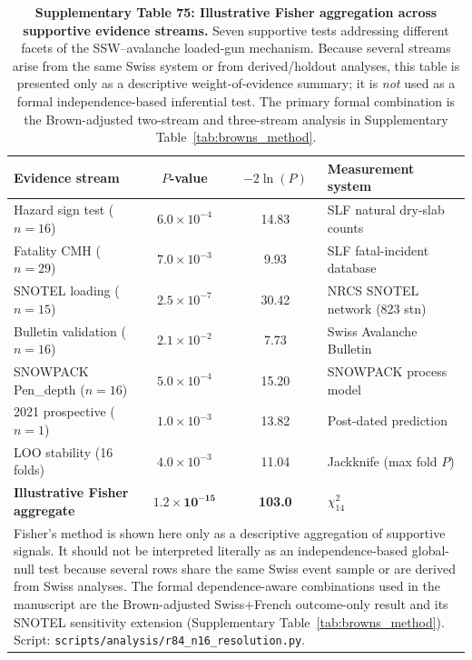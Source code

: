 \documentclass[11pt,letterpaper]{article}
\begin{document}
\begin{table}[!ht]
\centering
\caption{\textbf{Supplementary Table 75: Illustrative Fisher aggregation across supportive evidence streams.}
Seven supportive tests addressing different facets of the SSW--avalanche loaded-gun mechanism. Because several streams arise from the same Swiss system or from derived/holdout analyses, this table is presented only as a descriptive weight-of-evidence summary; it is \emph{not} used as a formal independence-based inferential test. The primary formal combination is the Brown-adjusted two-stream and three-stream analysis in Supplementary Table~\ref{tab:browns_method}.}
\label{tab:fisher_combined}
\small
\begin{tabular}{lccl}
\toprule
Evidence stream & $P$-value & $-2\ln(P)$ & Measurement system \\
\midrule
Hazard sign test ($n = 16$) & $6.0 \times 10^{-4}$ & 14.83 & SLF natural dry-slab counts \\
Fatality CMH ($n = 29$) & $7.0 \times 10^{-3}$ & 9.93 & SLF fatal-incident database \\
SNOTEL loading ($n = 15$) & $2.5 \times 10^{-7}$ & 30.42 & NRCS SNOTEL network (823 stn) \\
Bulletin validation ($n = 16$) & $2.1 \times 10^{-2}$ & 7.73 & Swiss Avalanche Bulletin \\
SNOWPACK Pen\_depth ($n = 16$) & $5.0 \times 10^{-4}$ & 15.20 & SNOWPACK process model \\
2021 prospective ($n = 1$) & $1.0 \times 10^{-3}$ & 13.82 & Post-dated prediction \\
LOO stability (16 folds) & $4.0 \times 10^{-3}$ & 11.04 & Jackknife (max fold $P$) \\
\midrule
\textbf{Illustrative Fisher aggregate} & $\mathbf{1.2 \times 10^{-15}}$ & \textbf{103.0} & $\chi^2_{14}$ \\
\bottomrule
\multicolumn{4}{p{14cm}}{\footnotesize Fisher's method is shown here only as a descriptive aggregation of supportive signals. It should not be interpreted literally as an independence-based global-null test because several rows share the same Swiss event sample or are derived from Swiss analyses. The formal dependence-aware combinations used in the manuscript are the Brown-adjusted Swiss+French outcome-only result and its SNOTEL sensitivity extension (Supplementary Table~\ref{tab:browns_method}). Script: \texttt{scripts/analysis/r84\_n16\_resolution.py}.} \\
\end{tabular}
\end{table}
\end{document}
